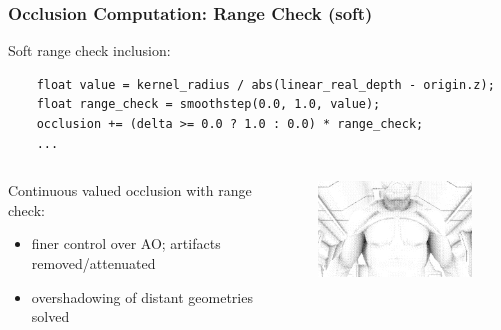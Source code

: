 \documentclass{beamer}
\begin{document}
\begin{frame}[fragile]
\frametitle{Occlusion Computation: Range Check (soft)}
Soft range check inclusion:
\begin{verbatim}
    float value = kernel_radius / abs(linear_real_depth - origin.z);
    float range_check = smoothstep(0.0, 1.0, value);
    occlusion += (delta >= 0.0 ? 1.0 : 0.0) * range_check;
    ...
\end{verbatim}

\begin{columns}
    \begin{column}{0.45\linewidth}
        Continuous valued occlusion with range check:
        \begin{itemize}
            \item finer control over AO; artifacts removed/attenuated
            \item overshadowing of distant geometries solved
        \end{itemize}
    \end{column}
    \begin{column}{0.45\linewidth}
        \begin{figure}
            \centering
            \includegraphics[width=0.8\linewidth]{images/occlusion_soft_range_check.png}
        \end{figure}
    \end{column}
\end{columns}

\end{frame}
\end{document}
